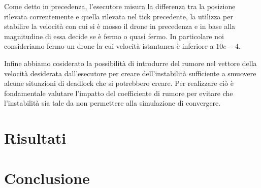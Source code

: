 \documentclass[a4paper,11pt,oneside, table]{article}
\begin{document}
Come detto in precedenza, l'esecutore misura la differenza tra la posizione rilevata correntemente e quella rilevata nel tick precedente, la utilizza per stabilire la velocit\`a con cui si \`e mosso il drone in precedenza e in base alla magnitudine di essa decide se \`e fermo o quasi fermo.
In particolare noi consideriamo fermo un drone la cui velocit\`a istantanea \`e inferiore a $10e-4$.

Infine abbiamo cosiderato la possibilit\`a di introdurre del rumore nel vettore della velocit\`a desiderata dall'esecutore per creare dell'instabilit\`a sufficiente a smuovere alcune situazioni di deadlock che si potrebbero creare.
Per realizzare ci\`o \`e fondamentale valutare l'impatto del coefficiente di rumore per evitare che l'instabilit\`a sia tale da non permettere alla simulazione di convergere.

\section{Risultati}

\section{Conclusione}

\printbibliography[title={Bibliografia}]
\end{document}
